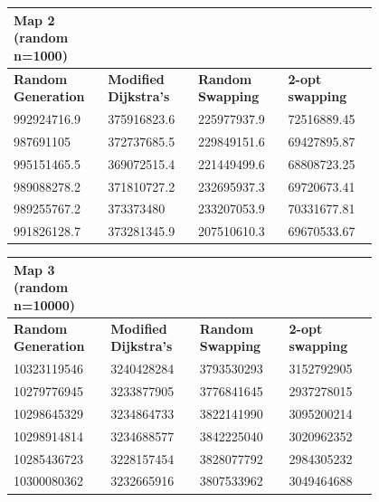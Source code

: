 \documentclass{article}
\begin{document}
\begin{table}[H]
    \centering
    \begin{tabular}{|p{0.2\linewidth}|p{0.2\linewidth}|p{0.2\linewidth}|p{0.2\linewidth}|}
    \hline
        \textbf{Map 2 (random n=1000)} & ~ & ~ & ~ \\ \hline
        \textbf{Random Generation} & \textbf{Modified Dijkstra's} & \textbf{Random Swapping} & \textbf{2-opt swapping} \\ \hline
        992924716.9 & 375916823.6 & 225977937.9 & 72516889.45 \\ \hline
        987691105 & 372737685.5 & 229849151.6 & 69427895.87 \\ \hline
        995151465.5 & 369072515.4 & 221449499.6 & 68808723.25 \\ \hline
        989088278.2 & 371810727.2 & 232695937.3 & 69720673.41 \\ \hline
        989255767.2 & 373373480 & 233207053.9 & 70331677.81 \\ \hline
        991826128.7 & 373281345.9 & 207510610.3 & 69670533.67 \\ \hline
    \end{tabular}
\end{table}

\begin{table}[H]
    \centering
    \begin{tabular}{|p{0.2\linewidth}|p{0.2\linewidth}|p{0.2\linewidth}|p{0.2\linewidth}|}
    \hline
        \textbf{Map 3 (random n=10000)} & ~ & ~ & ~ \\ \hline
        \textbf{Random Generation} & \textbf{Modified Dijkstra's} & \textbf{Random Swapping} & \textbf{2-opt swapping} \\ \hline
        10323119546 & 3240428284 & 3793530293 & 3152792905 \\ \hline
        10279776945 & 3233877905 & 3776841645 & 2937278015 \\ \hline
        10298645329 & 3234864733 & 3822141990 & 3095200214 \\ \hline
        10298914814 & 3234688577 & 3842225040 & 3020962352 \\ \hline
        10285436723 & 3228157454 & 3828077792 & 2984305232 \\ \hline
        10300080362 & 3232665916 & 3807533962 & 3049464688 \\ \hline
    \end{tabular}
\end{table}
\end{document}
